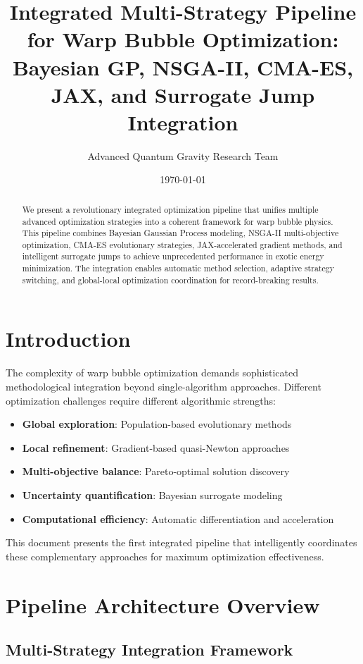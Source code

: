 \documentclass[11pt,a4paper]{article}
\title{Integrated Multi-Strategy Pipeline for Warp Bubble Optimization:\\
Bayesian GP, NSGA-II, CMA-ES, JAX, and Surrogate Jump Integration}
\author{Advanced Quantum Gravity Research Team}
\date{\today}
\begin{document}
\maketitle

\begin{abstract}
We present a revolutionary integrated optimization pipeline that unifies multiple advanced optimization strategies into a coherent framework for warp bubble physics. This pipeline combines Bayesian Gaussian Process modeling, NSGA-II multi-objective optimization, CMA-ES evolutionary strategies, JAX-accelerated gradient methods, and intelligent surrogate jumps to achieve unprecedented performance in exotic energy minimization. The integration enables automatic method selection, adaptive strategy switching, and global-local optimization coordination for record-breaking results.
\end{abstract}

\section{Introduction}

The complexity of warp bubble optimization demands sophisticated methodological integration beyond single-algorithm approaches. Different optimization challenges require different algorithmic strengths:

\begin{itemize}
\item \textbf{Global exploration}: Population-based evolutionary methods
\item \textbf{Local refinement}: Gradient-based quasi-Newton approaches  
\item \textbf{Multi-objective balance}: Pareto-optimal solution discovery
\item \textbf{Uncertainty quantification}: Bayesian surrogate modeling
\item \textbf{Computational efficiency}: Automatic differentiation and acceleration
\end{itemize}

This document presents the first integrated pipeline that intelligently coordinates these complementary approaches for maximum optimization effectiveness.

\section{Pipeline Architecture Overview}

\subsection{Multi-Strategy Integration Framework}
\end{document}
